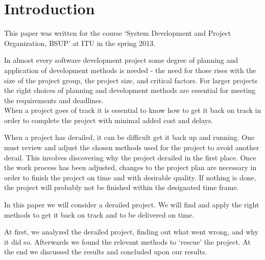 \section{Introduction}
This paper was written for the course `System Development and Project Organization, BSUP' at ITU in the spring 2013.

In almost every software development project some degree of planning and application of development methods is needed - the need for those rises with the size of the project group, the project size, and critical factors. For larger projects the right choices of planning and development methods are essential for meeting the requirements and deadlines.\\
When a project goes of track it is essential to know how to get it back on track in order to complete the project with minimal added cost and delays. %

When a project has derailed, it can be difficult get it back up and running. One must review and adjust the chosen methods used for the project to avoid another derail. This involves discovering why the project derailed in the first place.
Once the work process has been adjusted, changes to the project plan are necessary in order to finish the project on time and with desirable quality. If nothing is done, the project will probably not be finished within the designated time frame.

In this paper we will consider a derailed project. We will find and apply the right methods to get it back on track and to be delivered on time.

At first, we analyzed the derailed project, finding out what went wrong, and why it did so. Afterwards we found the relevant methods to `rescue' the project. At the end we discussed the results and concluded upon our results.
\newpage